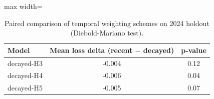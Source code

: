 \begin{table}[t]
  \centering
  \small
  \caption{Paired comparison of temporal weighting schemes on 2024 holdout (Diebold-Mariano test).}
  \label{tab:dm-test}
  \begin{adjustbox}{max width=\textwidth}
\begin{tabular}{lcc}
    \toprule
    \textbf{Model}  & \textbf{Mean loss delta (recent $-$ decayed)}  & \textbf{p-value} \\
    \midrule
    decayed-H3 & -0.004 & 0.12 \\
    decayed-H4 & -0.006 & 0.04 \\
    decayed-H5 & -0.005 & 0.07 \\
    \bottomrule
  \end{tabular}
\end{adjustbox}
\end{table}
